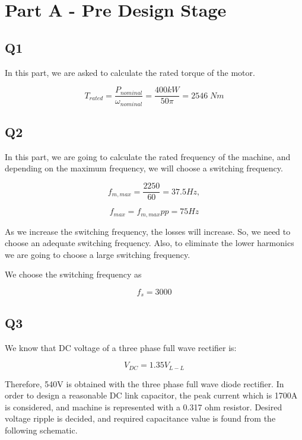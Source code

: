 \section{Part A - Pre Design Stage}
\subsection{Q1}
In this part, we are asked to calculate the rated torque of the motor.

\begin{equation}
    T_{rated} = \dfrac{P_{nominal}}{\omega_{nominal}} = \dfrac{400kW}{50\pi} = 2546 \; Nm
\end{equation}

\subsection{Q2}
In this part, we are going to calculate the rated frequency of the machine, and depending on the maximum frequency, we will choose a switching frequency.

\begin{equation}
    f_{m,max} = \dfrac{2250}{60} = 37.5 Hz,
\end{equation}

\begin{equation}
    f_{max} = f_{m,max} pp = 75 Hz
\end{equation}

As we increase the switching frequency, the losses will increase. So, we need to choose an adequate switching frequency. Also, to eliminate the lower harmonics we are going to choose a large switching frequency.

We choose the switching frequency as

\begin{equation}
    f_s = 3000
\end{equation}

\subsection{Q3}

We know that DC voltage of a three phase full wave rectifier is:

\begin{equation}
    V_{DC} = 1.35 V_{L-L}
\end{equation}

Therefore, 540V is obtained with the three phase full wave diode rectifier. In order to design a reasonable DC link capacitor, the peak current which is 1700A is considered, and machine is represented with a 0.317 ohm resistor. Desired voltage ripple is decided, and required capacitance value is found from the following schematic.

